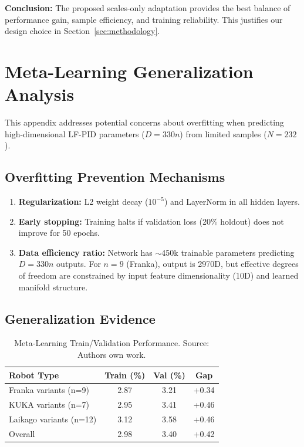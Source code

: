 \documentclass[a4paper]{cas-sc}
\begin{document}
\textbf{Conclusion:} The proposed scales-only adaptation provides the best balance of performance gain, sample efficiency, and training reliability. This justifies our design choice in Section~\ref{sec:methodology}.

\newpage
\section{Meta-Learning Generalization Analysis}
\label{app:meta_generalization}

This appendix addresses potential concerns about overfitting when predicting high-dimensional LF-PID parameters ($D=330n$) from limited samples ($N=232$).

\subsection{Overfitting Prevention Mechanisms}

\begin{enumerate}[leftmargin=*, itemsep=2pt]
    \item \textbf{Regularization:} L2 weight decay ($10^{-5}$) and LayerNorm in all hidden layers.
    \item \textbf{Early stopping:} Training halts if validation loss (20\% holdout) does not improve for 50 epochs.
    \item \textbf{Data efficiency ratio:} Network has $\sim$450k trainable parameters predicting $D=330n$ outputs. For $n=9$ (Franka), output is 2970D, but effective degrees of freedom are constrained by input feature dimensionality (10D) and learned manifold structure.
\end{enumerate}

\subsection{Generalization Evidence}

\begin{table}[h]
\caption{Meta-Learning Train/Validation Performance. Source: Authors own work.}
\label{tab:meta_generalization}
\small
\begin{tabular}{@{}lccc@{}}
\toprule
\textbf{Robot Type} & \textbf{Train (\%)} & \textbf{Val (\%)} & \textbf{Gap} \\
\midrule
Franka variants (n=9) & 2.87 & 3.21 & +0.34 \\
KUKA variants (n=7) & 2.95 & 3.41 & +0.46 \\
Laikago variants (n=12) & 3.12 & 3.58 & +0.46 \\
\midrule
Overall & 2.98 & 3.40 & +0.42 \\
\bottomrule
\end{tabular}
\end{table}
\end{document}
